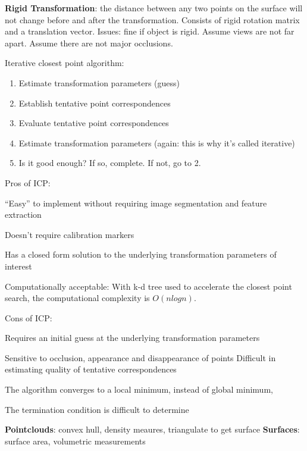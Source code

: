 \documentclass[8pt]{extarticle}
\begin{document}
\begin{multicols}{2}
\textbf{Rigid Transformation}: the distance between any two points on the surface will not change before and after the transformation. Consists of rigid rotation matrix and a translation vector. Issues: fine if object is rigid. Assume views are not far apart. Assume there are not major occlusions.

Iterative closest point algorithm:
\begin{enumerate}
    \item Estimate transformation parameters (guess)
    \item Establish tentative point correspondences
    \item Evaluate tentative point correspondences
    \item Estimate transformation parameters (again: this is why it’s called iterative)
    \item Is it good enough? If so, complete. If not, go to 2.
\end{enumerate}

Pros of ICP:
\begin{compactitem}
    \item ``Easy'' to implement without requiring image segmentation and feature extraction
    \item Doesn’t require calibration markers
    \item Has a closed form solution to the underlying transformation parameters of interest
    \item Computationally acceptable: With k-d tree used to accelerate the closest point search, the computational complexity is $O(n log n)$.
\end{compactitem}

Cons of ICP:
\begin{compactitem}
    \item Requires an initial guess at the underlying transformation parameters
    \item Sensitive to occlusion, appearance and disappearance of points Difficult in estimating quality of tentative correspondences
    \item The algorithm converges to a local minimum, instead of global minimum,
    \item The termination condition is difficult to determine
\end{compactitem}

\textbf{Pointclouds}: convex hull, density meaures, triangulate to get surface
\textbf{Surfaces}: surface area, volumetric measurements


\end{multicols}
\end{document}
